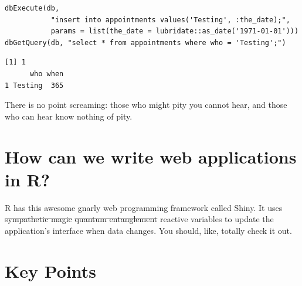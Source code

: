 \begin{lstlisting}
dbExecute(db,
           "insert into appointments values('Testing', :the_date);",
           params = list(the_date = lubridate::as_date('1971-01-01')))
dbGetQuery(db, "select * from appointments where who = 'Testing';")
\end{lstlisting}

\begin{lstlisting}
[1] 1
      who when
1 Testing  365
\end{lstlisting}

\noindent
There is no point screaming:
those who might pity you cannot hear,
and those who can hear know nothing of pity.

\section{How can we write web applications in R?}

R has this awesome gnarly web programming framework called Shiny.
It uses \st{sympathetic magic} \st{quantum entanglement} reactive variables
to update the application's interface when data changes.
You should, like, totally check it out.

\section{Key Points}

